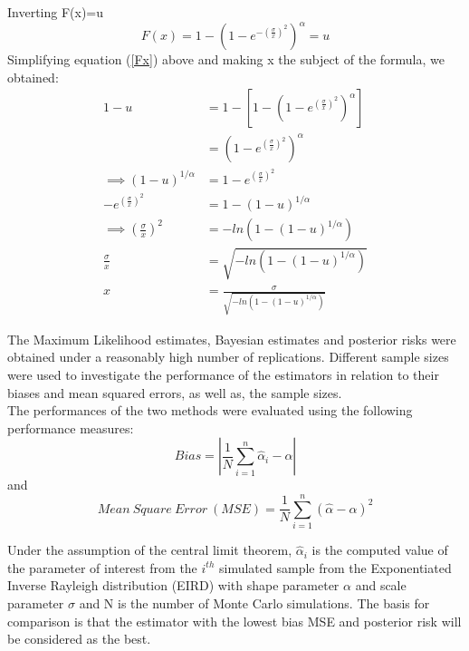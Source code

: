 \documentclass[a4paper,12pt]{report}
\newcommand{\para}{\hspace{0.5cm}}
\begin{document}
Inverting F(x)=u
\begin{equation}\label{Fx}
F(x)=1-(1-e^{-(\frac{\sigma}{x})^2})^\alpha=u 
\end{equation}
Simplifying equation (\ref{Fx}) above and making x the subject of the formula, we obtained:
\begin{equation}
\begin{split}
1-u&=1-\left[1-\left(1-e^{\left(\frac{\sigma}{x}\right)^2}\right)^\alpha\right]\\
&=\left(1-e^{\left(\frac{\sigma}{x}\right)^2}\right)^\alpha\\
\implies(1-u)^{1/\alpha}&=1-e^{\left(\frac{\sigma}{x}\right)^2}\\
-e^{\left(\frac{\sigma}{x}\right)^2}&=1-(1-u)^{1/\alpha}\\
\implies \left(\frac{\sigma}{x}\right)^2&=-ln(1-(1-u)^{1/\alpha})\\
\frac{\sigma}{x}&=\sqrt{-ln(1-(1-u)^{1/\alpha})}\\
x&=\frac{\sigma}{\sqrt{-ln(1-(1-u)^{1/\alpha})}}
\end{split}\label{quantilefn}
\end{equation}


\noindent\para The Maximum Likelihood estimates, Bayesian estimates and posterior risks were obtained under a reasonably high number of replications. Different sample sizes were used to investigate the performance of the estimators in relation to their biases and mean squared errors, as well as, the sample sizes. \\
The performances of the two methods were evaluated using the following performance measures:
\begin{equation}\label{Bias}
Bias = \left| \frac{1}{N}\sum\limits_{i=1}^n \hat{\alpha}_i-\alpha\right|
\end{equation}
and
\begin{equation}\label{(MSE)}
Mean\ Square\ Error\ (MSE)= \frac{1}{N}\sum\limits_{ i=1 }^{n}(\hat{\alpha}-\alpha)^2 
\end{equation}

\noindent\para Under the assumption of the central limit theorem, $\hat{\alpha}_i$ is the computed value of the parameter of interest from the $i^{th}$ simulated sample from the Exponentiated Inverse Rayleigh distribution (EIRD) with shape parameter $\alpha$ and scale parameter $\sigma$ and N is the number of Monte Carlo simulations. The basis for comparison is that the estimator with the lowest bias MSE and posterior risk will be considered as the best. 
\end{document}
